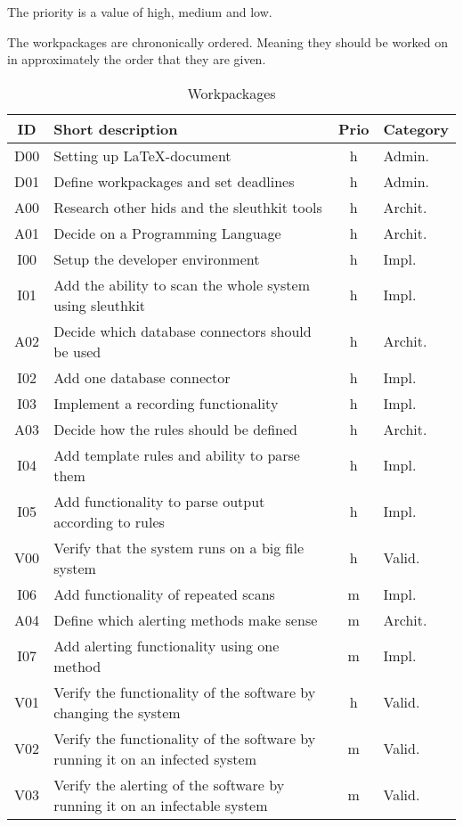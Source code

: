 The priority is a value of high, medium and low. 

The workpackages are chrononically ordered. Meaning they should be worked on in approximately the order that they are given. 

\begin{table}[!ht]
  \begin{center}
    \caption{Workpackages}
    \label{tab:workpackages}
    \begin{tabular}{c|l|c|l}
      \textbf{ID} & \textbf{Short description} & \textbf{Prio} & \textbf{Category} \\
      \hline
		D00 & Setting up \LaTeX -document & h & Admin. \\
		D01 & Define workpackages and set deadlines & h & Admin. \\
		A00 & Research other \gls{hids} and the sleuthkit tools & h & Archit. \\
		A01 & Decide on a Programming Language & h & Archit. \\
		I00 & Setup the developer environment & h & Impl. \\
		I01 & Add the ability to scan the whole system using sleuthkit & h & Impl. \\
		A02 & Decide which database connectors should be used & h & Archit. \\
		I02 & Add one database connector & h & Impl. \\
		I03 & Implement a recording functionality & h & Impl. \\
		A03 & Decide how the rules should be defined & h & Archit. \\
		I04 & Add template rules and ability to parse them & h & Impl. \\
		I05 & Add functionality to parse output according to rules & h & Impl. \\
		V00 & Verify that the system runs on a big file system & h & Valid. \\
		I06 & Add functionality of repeated scans & m & Impl. \\
		A04 & Define which alerting methods make sense & m & Archit. \\ 
		I07 & Add alerting functionality using one method & m & Impl. \\
		V01 & Verify the functionality of the software by changing the system & h & Valid. \\
		V02 & Verify the functionality of the software by running it on an infected system & m & Valid. \\
		V03 & Verify the alerting of the software by running it on an infectable system & m & Valid. \\

\end{tabular}
\end{center}
\end{table}
